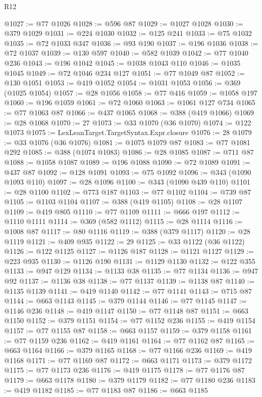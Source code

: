 \begin{lexlean}{R12}
\begin{coremodule}
@1027 := @77 @1026
@1028 := @596 @87
@1029 := @1027 @1028
@1030 := @379 @1029
@1031 := @224 @1030
@1032 := @125 @241
@1033 := @75 @1032
@1035 := @72 @1033 @347
@1036 := @93 @190
@1037 := @196 @1036
@1038 := @72 @1037
@1039 := @130 @597
@1040 := @582 @1039
@1042 := @77 @1040 @236
@1043 := @196 @1042
@1045 := @1038 @1043 @110
@1046 := @1035 @1045
@1049 := @72 @1046 @234 @127
@1051 := @77 @1049 @87
@1052 := @130 @1051
@1053 := @419 @1052
@1054 := @1031 @1053
@1056 := @369 (@1025 @1054)
@1057 := @28 @1056
@1058 := @77 @416
@1059 := @1058 @197
@1060 := @196 @1059
@1061 := @72 @1060
@1063 := @1061 @127 @734
@1065 := @77 @1063 @87
@1066 := @437 @1065
@1068 := @388 (@419 @1066)
@1069 := @28 @1068
@1070 := 27
@1073 := @33 @1070 (@36 @1070)
@1074 := @122 @1073
@1075 := LexLeanTarget.TargetSyntax.Expr.closure
@1076 := 28
@1079 := @33 @1076 (@36 @1076)
@1081 := @1075 @1079 @87
@1083 := @77 @1081 @292
@1085 := @388 (@1074 @1083)
@1086 := @28 @1085
@1087 := @711 @87
@1088 := @1058 @1087
@1089 := @196 @1088
@1090 := @72 @1089
@1091 := @437 @87
@1092 := @128 @1091
@1093 := @75 @1092
@1096 := @343 (@1090 @1093 @110)
@1097 := @28 @1096
@1100 := @343 (@1090 @439 @110)
@1101 := @28 @1100
@1102 := @773 @187
@1103 := @77 @1102
@1104 := @739 @87
@1105 := @1103 @1104
@1107 := @388 (@419 @1105)
@1108 := @28 @1107
@1109 := @419 @805
@1110 := @77 @1109
@1111 := @666 @197
@1112 := @1110 @1111
@1114 := @369 (@582 @1112)
@1115 := @28 @1114
@1116 := @1008 @87
@1117 := @80 @1116
@1119 := @388 (@379 @1117)
@1120 := @28 @1119
@1121 := @409 @935
@1122 := 29
@1125 := @33 @1122 (@36 @1122)
@1126 := @122 @1125
@1127 := @1126 @187
@1128 := @1121 @1127
@1129 := @223 @935
@1130 := @1126 @190
@1131 := @1129 @1130
@1132 := @122 @355
@1133 := @947 @129
@1134 := @1133 @38
@1135 := @77 @1134
@1136 := @947 @92
@1137 := @1136 @38
@1138 := @77 @1137
@1139 := @1138 @87
@1140 := @1135 @1139
@1141 := @419 @1140
@1142 := @77 @1141
@1143 := @715 @87
@1144 := @663 @1143
@1145 := @379 @1144
@1146 := @77 @1145
@1147 := @1146 @236
@1148 := @419 @1147
@1150 := @77 @1148 @87
@1151 := @663 @1150
@1152 := @379 @1151
@1154 := @77 @1152 @236
@1155 := @419 @1154
@1157 := @77 @1155 @87
@1158 := @663 @1157
@1159 := @379 @1158
@1161 := @77 @1159 @236
@1162 := @419 @1161
@1164 := @77 @1162 @87
@1165 := @663 @1164
@1166 := @379 @1165
@1168 := @77 @1166 @236
@1169 := @419 @1168
@1171 := @77 @1169 @87
@1172 := @663 @1171
@1173 := @379 @1172
@1175 := @77 @1173 @236
@1176 := @419 @1175
@1178 := @77 @1176 @87
@1179 := @663 @1178
@1180 := @379 @1179
@1182 := @77 @1180 @236
@1183 := @419 @1182
@1185 := @77 @1183 @87
@1186 := @663 @1185

\end{coremodule}
\end{lexlean}
